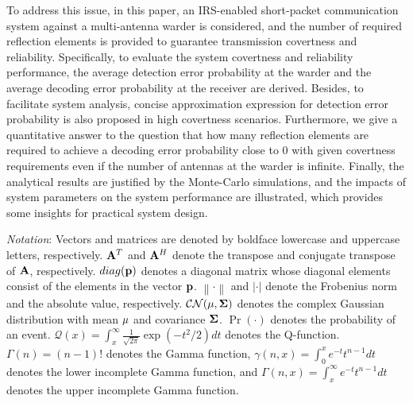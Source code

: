 \documentclass[conference]{IEEEtran}
\begin{document}
To address this issue, in this paper, an IRS-enabled short-packet communication system against a multi-antenna warder is considered, and the number of required reflection elements is provided to guarantee transmission covertness and reliability. Specifically, to evaluate the system covertness and reliability performance, the average detection error probability at the warder and the average decoding error probability at the receiver are derived. Besides, to facilitate system analysis, concise approximation expression for detection error probability is also proposed in high covertness scenarios. Furthermore, we give a quantitative answer to the question that how many reflection elements are required to achieve a decoding error probability close to 0 with given covertness requirements even if the number of antennas at the warder is infinite. Finally, the analytical results are justified by the Monte-Carlo simulations, and the impacts of system parameters on the system performance are illustrated, which provides some insights for practical system design.




\emph{Notation}: Vectors and matrices are denoted by boldface lowercase and uppercase letters, respectively. ${\bf{A}}^T$ and ${\bf{A}}^H$ denote the  transpose and conjugate transpose of ${\bf{A}}$, respectively. $diag({\bf{p}})$ denotes a diagonal matrix whose diagonal elements consist of the elements in the vector ${\bf{p}}$. $\left\| {\cdot} \right\|$ and $\left|  \cdot  \right|$ denote the Frobenius norm and the absolute value, respectively. $\mathcal{C N}({\bf{\mu}}, {\bf{\Sigma}})$ denotes the complex Gaussian distribution with mean ${\bf{\mu}}$ and covariance ${\bf{\Sigma}}$. ${\Pr}(\cdot)$ denotes the probability of an event. $\mathcal{Q}(x)=\int_x^{\infty} \frac{1}{\sqrt{2 \pi}} \exp \left(-t^2 / 2\right) d t$ denotes the Q-function. $\Gamma \left( n \right) = \left( {n - 1} \right)!$ denotes the Gamma function, $\gamma(n, x)=\int_0^x e^{-t} t^{n-1} d t$ denotes the lower incomplete Gamma function, and $\Gamma(n, x)=\int_x^{\infty} e^{-t} t^{n-1} d t$ denotes the upper incomplete Gamma function. 
\end{document}
